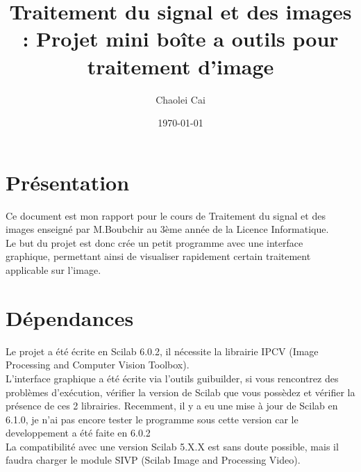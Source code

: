 \documentclass[12pt, letterpaper]{article}
\title{Traitement du signal et des images : Projet mini boîte a outils pour traitement d'image}
\author{Chaolei Cai
\\
    \multicolumn{1}{
        p{.7\textwidth}}{\centering\emph{Université Paris Vincennes St-Denis\\
  UFR mathématiques, informatique, technologies sciences de l'information\\}
  L3 Informatique}
}
\date{\today}
\begin{document}
\begin{titlepage}
    \maketitle
\end{titlepage}

\tableofcontents

\section{Présentation}
Ce document est mon rapport pour le cours de Traitement du signal et des images enseigné par M.Boubchir au 3ème année de 
la Licence Informatique.\\
Le but du projet est donc crée un petit programme avec une interface \\graphique, permettant ainsi de 
visualiser rapidement certain traitement applicable sur l'image.

\section{Dépendances}
Le projet a été écrite en Scilab 6.0.2, il nécessite la librairie IPCV (Image Processing and Computer Vision Toolbox).\\
L'interface graphique a été écrite via l'outils guibuilder, si vous rencontrez des problèmes d'exécution, vérifier la version de Scilab 
que vous possèdez et vérifier la présence de ces 2 librairies. Recemment, il y a eu une mise à jour de Scilab en 6.1.0, je n'ai 
pas encore tester le programme sous cette version car le developpement a été faite en 6.0.2\\
La compatibilité avec une version Scilab 5.X.X est sans doute possible, mais il faudra charger le module 
SIVP (Scilab Image and Processing Video).






\end{document}
